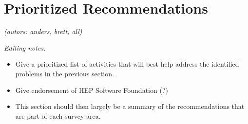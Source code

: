 \section{Prioritized Recommendations}

\textit{(autors: anders, brett, all)}

\textit{Editing notes:}
\begin{itemize}
\item Give a prioritized list of activities that will best help address the identified problems in the previous section. 
\item Give endorsement of HEP Software Foundation (?)
\item This section should then largely be a summary of the recommendations that are part of each survey area.
\end{itemize}